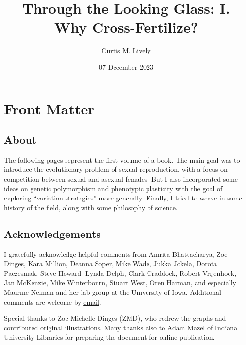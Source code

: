 \documentclass[
  letterpaper,
]{book}
\title{Through the Looking Glass: I. Why Cross-Fertilize?}
\author{Curtis M. Lively}
\date{07 December 2023}
\renewcommand*\contentsname{Table of contents}
\newcommand\contentsname{Table of contents}
\begin{document}
\frontmatter
\maketitle

\renewcommand*\contentsname{Contents}
{
\hypersetup{linkcolor=}
\setcounter{tocdepth}{2}
\tableofcontents
}
\listoffigures
\listoftables
\mainmatter
{}

\chapter*{Front Matter}\label{front-matter}


\section*{About}\label{about}


The following pages represent the first volume of a book. The main goal
was to introduce the evolutionary problem of sexual reproduction, with a
focus on competition between sexual and asexual females. But I also
incorporated some ideas on genetic polymorphism and phenotypic
plasticity with the goal of exploring ``variation strategies'' more
generally. Finally, I tried to weave in some history of the field, along
with some philosophy of science.

\section*{Acknowledgements}\label{acknowledgements}


I gratefully acknowledge helpful comments from Amrita Bhattacharya, Zoe
Dinges, Kara Million, Deanna Soper, Mike Wade, Jukka Jokela, Dorota
Paczesniak, Steve Howard, Lynda Delph, Clark Craddock, Robert
Vrijenhoek, Jan McKenzie, Mike Winterbourn, Stuart West, Oren Harman,
and especially Maurine Neiman and her lab group at the University of
Iowa. Additional comments are welcome by
\href{mailto:clively@indiana.edu}{email}.

Special thanks to Zoe Michelle Dinges (ZMD), who redrew the graphs and
contributed original illustrations. Many thanks also to Adam Mazel of
Indiana University Libraries for preparing the document for online
publication.
\end{document}
